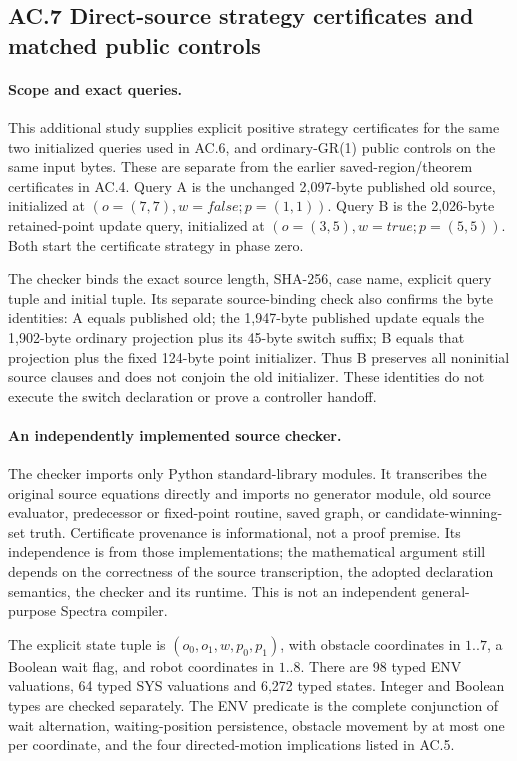 \subsection*{AC.7 Direct-source strategy certificates and matched public controls}
\label{supp:r6-obstacle-certificates}

\paragraph{Scope and exact queries.}
This additional study supplies explicit positive strategy certificates for
the same two initialized queries used in AC.6, and ordinary-GR(1) public
controls on the same input bytes. These are separate from the earlier
saved-region/theorem certificates in AC.4.
Query A is the unchanged 2,097-byte published old source, initialized at
$(o=(7,7),w=\mathit{false};p=(1,1))$.
Query B is the 2,026-byte retained-point update query, initialized at
$(o=(3,5),w=\mathit{true};p=(5,5))$.
Both start the certificate strategy in phase zero.

The checker binds the exact source length, SHA-256, case name, explicit
query tuple and initial tuple. Its separate source-binding check also
confirms the byte identities: A equals published old; the 1,947-byte
published update equals the 1,902-byte ordinary projection plus its
45-byte switch suffix; B equals that projection plus the fixed 124-byte
point initializer. Thus B preserves all noninitial source clauses and
does not conjoin the old initializer. These identities do not execute
the switch declaration or prove a controller handoff.

\paragraph{An independently implemented source checker.}
The checker imports only Python standard-library modules. It transcribes
the original source equations directly and imports no generator module,
old source evaluator, predecessor or fixed-point routine, saved graph,
or candidate-winning-set truth. Certificate provenance is informational,
not a proof premise. Its independence is from those implementations;
the mathematical argument still depends on the correctness of the
source transcription, the adopted declaration semantics, the checker
and its runtime. This is not an independent general-purpose Spectra
compiler.

The explicit state tuple is $(o_0,o_1,w,p_0,p_1)$, with obstacle coordinates
in $1..7$, a Boolean wait flag, and robot coordinates in $1..8$.
There are 98 typed ENV valuations, 64 typed SYS valuations and 6,272
typed states. Integer and Boolean types are checked separately.
The ENV predicate is the complete conjunction of wait alternation,
waiting-position persistence, obstacle movement by at most one per
coordinate, and the four
directed-motion implications listed in AC.5.

